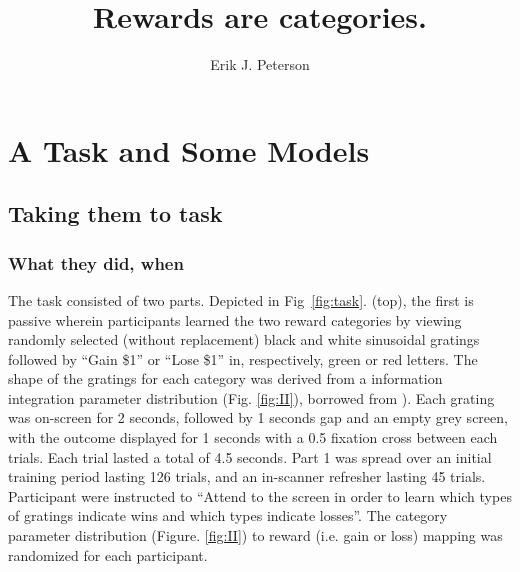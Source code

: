 \documentclass[doc,12pt]{apa}        %
\title{Rewards are categories.}
\author{Erik J. Peterson} \affiliation{Dept. of Psychology \\ Colorado State University \\ Fort Collins, CO}
\begin{document}
 
\maketitle

\section{A Task and Some Models} %
\label{sec:task_and_models}

\subsection{Taking them to task}
\label{to_task}
\subsubsection{What they did, when}
\label{what_when}
The task consisted of two parts.  Depicted in Fig~\ref{fig:task}. (top), the first is passive wherein participants learned the two reward categories by viewing randomly selected (without replacement) black and white sinusoidal gratings followed by ``Gain \$1'' or ``Lose \$1'' in, respectively, green or red letters.  The shape of the gratings for each category was derived from a information integration parameter distribution (Fig. \ref{fig:II}), borrowed from \cite{Spiering:2008p5008}).  Each grating was on-screen for 2 seconds, followed by 1 seconds gap and an empty grey screen, with the outcome displayed for 1 seconds with a 0.5 fixation cross between each trials. Each trial lasted a total of 4.5 seconds. Part 1 was spread over an initial training period lasting 126 trials, and an in-scanner refresher lasting 45 trials.  Participant were instructed to ``Attend to the screen in order to learn which types of gratings indicate wins and which types indicate losses''.  The category parameter distribution (Figure. \ref{fig:II}) to reward (i.e. gain or loss) mapping was randomized for each participant.
\end{document}
